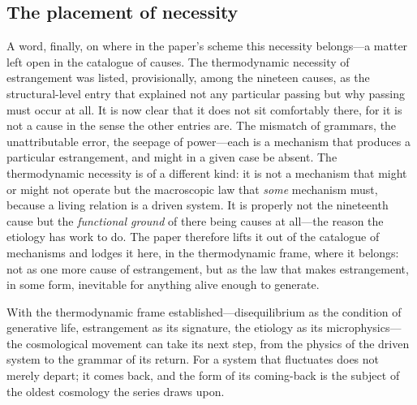 \subsection{The placement of necessity}
\label{p17:sub:dissipation-placement}

A word, finally, on where in the paper's scheme this necessity belongs---a matter left open in the catalogue of causes. The thermodynamic necessity of estrangement was listed, provisionally, among the nineteen causes, as the structural-level entry that explained not any particular passing but why passing must occur at all. It is now clear that it does not sit comfortably there, for it is not a cause in the sense the other entries are. The mismatch of grammars, the unattributable error, the seepage of power---each is a mechanism that produces a particular estrangement, and might in a given case be absent. The thermodynamic necessity is of a different kind: it is not a mechanism that might or might not operate but the macroscopic law that \emph{some} mechanism must, because a living relation is a driven system. It is properly not the nineteenth cause but the \emph{functional ground} of there being causes at all---the reason the etiology has work to do. The paper therefore lifts it out of the catalogue of mechanisms and lodges it here, in the thermodynamic frame, where it belongs: not as one more cause of estrangement, but as the law that makes estrangement, in some form, inevitable for anything alive enough to generate.

\noindent
With the thermodynamic frame established---disequilibrium as the condition of generative life, estrangement as its signature, the etiology as its microphysics---the cosmological movement can take its next step, from the physics of the driven system to the grammar of its return. For a system that fluctuates does not merely depart; it comes back, and the form of its coming-back is the subject of the oldest cosmology the series draws upon.

